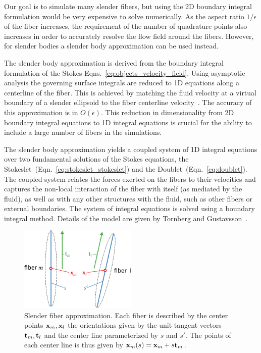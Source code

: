 Our goal is to simulate many slender fibers, but using the 2D boundary integral formulation would be very expensive to solve numerically. As the aspect ratio $1/\epsilon$ of the fiber increases, the requirement of the number of quadrature points also increases in order to accurately resolve the flow field around the fibers. However, for slender bodies a slender body approximation can be used instead. 

The slender body approximation is derived from the boundary integral formulation of the Stokes Eqns.~\eqref{eq:objects_velocity_field}. Using asymptotic analysis the governing surface integrals are reduced to 1D equations along a centerline of the fiber. This is achieved by matching the fluid velocity at a virtual boundary of a slender ellipsoid to the fiber centerline velocity~\cite{Gotz2000}. The accuracy of this approximation is in $O(\epsilon).$ This reduction in dimensionality from 2D boundary integral equations to 1D integral equations is crucial for the ability to include a large number of fibers in the simulations.

The slender body approximation yields a coupled system of 1D integral equations over two fundamental solutions of the Stokes equations, the Stokeslet~(Eqn.~\eqref{eq:stokeslet_stokeslet}) and the Doublet~(Eqn.~\eqref{eq:doublet}). The coupled system relates the forces exerted on the fibers to their velocities and captures the non-local interaction of the fiber with itself (as mediated by the fluid), as well as with any other structures with the fluid, such as other fibers or external boundaries. The system of integral equations is solved using a boundary integral method. Details of the model are given by Tornberg and Gustavsson~\cite{Tornberg2006}.

\begin{figure}[!htbp]
  \centering
  \includegraphics[width=0.5\textwidth]{img/slender.pdf}
  \caption[Slender fiber approximation.]{Slender fiber approximation. Each fiber is described by the center points $\mathbf{x}_m, \mathbf{x}_l$ the orientations given by the unit tangent vectors $\mathbf{t}_m, \mathbf{t}_l$ and the center line parameterized by $s$ and $s'$. The points of each center line is thus given by $\mathbf{x}_m(s) = \mathbf{x}_m + s\mathbf{t}_m$.}
  \label{fig:slender_fiber}
\end{figure}

